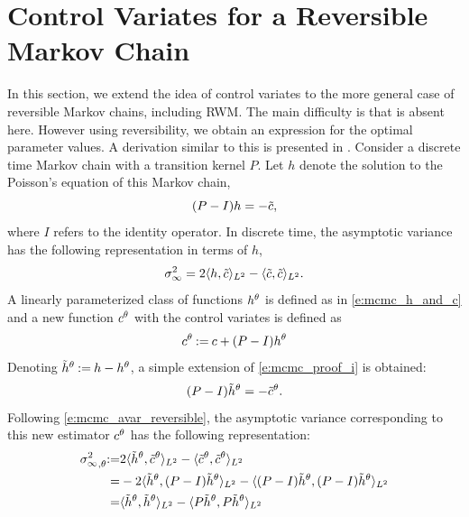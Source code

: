\section{Control Variates for a Reversible Markov Chain} 
\label{s:mcmc_reversible_mc_cv}
In this section, we extend the idea of control variates to the more general case of reversible Markov chains, including RWM. The main difficulty is that  is absent here. However using reversibility, we obtain an expression for the optimal parameter values. A derivation similar to this is presented in \cite{delkon12}.
Consider a discrete time Markov chain with a transition kernel $P$.  Let $h$ denote the solution to the Poisson's equation of this Markov chain,
\[
(P - I) h = -\tilde c,
\]
where $I$ refers to the identity operator.
In discrete time, the asymptotic variance has the following representation in terms of $h$,
\begin{equation}
\asymvar = 2 \langle h, \tilc \rangle_{L^2} - \langle \tilc, \tilc \rangle_{L^2}.
\label{e:mcmc_avar_reversible}
\end{equation}
A linearly parameterized class of functions $h^\theta$ is defined as in \eqref{e:mcmc_h_and_c} and a new function $c^\theta$ with the control variates is defined as
\begin{equation}
c^\param \eqdef c +  (P - I) h^\param
\label{e:mcmc_discrete_cv}
\end{equation}
Denoting $\tilde h^\theta \mathbin{:=} h - h^\theta$, a simple extension of \eqref{e:mcmc_proof_i} is obtained:
\begin{equation}
(P - I) \tilh^\param = -\tilc^\param.
\label{e:mcmc_discrete_poissons_cv}
\end{equation}
Following \eqref{e:mcmc_avar_reversible}, the asymptotic variance corresponding to this new estimator $c^\theta$ has the following representation:
\begin{equation}
\begin{aligned}
{\asymvar}_{,\param} \eqdef & 2 \langle \tilh^\param, \tilc^\param \rangle_{L^2} - \langle \tilc^\param, \tilc^\param \rangle_{L^2}\\
= &  - 2 \langle \tilh^\param, (P - I) \tilh^\param \rangle_{L^2} -\langle (P - I) \tilh^\param, (P - I) \tilh^\param \rangle_{L^2}\\
= & \langle \tilh^\param, \tilh^\param \rangle_{L^2} - \langle P \tilh^\param, P \tilh^\param \rangle_{L^2}
\label{e:mcmc_asym_var_theta_discrete}
\end{aligned}
\end{equation}
